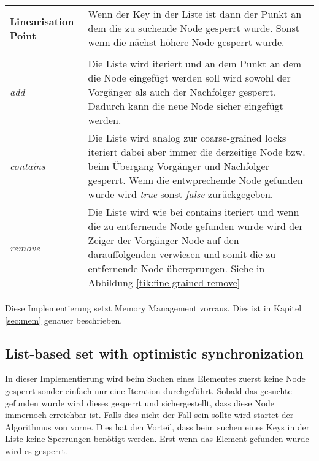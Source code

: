 \begin{table}[H]
    \begin{tabularx}{\textwidth}{lX}
        \textbf{Linearisation Point} & Wenn der Key in der Liste ist dann der Punkt an dem die zu suchende Node gesperrt wurde. Sonst wenn die nächst höhere Node gesperrt wurde.\\
        \\
        \textit{add} & Die Liste wird iteriert und an dem Punkt an dem die Node eingefügt werden soll wird sowohl der Vorgänger als auch der Nachfolger gesperrt. Dadurch kann die neue Node sicher eingefügt werden.\\
        \textit{contains} & Die Liste wird analog zur coarse-grained locks iteriert dabei aber immer die derzeitige Node bzw. beim Übergang Vorgänger und Nachfolger gesperrt. Wenn die entwprechende Node gefunden wurde wird \textit{true} sonst \textit{false} zurückgegeben. \\
        \textit{remove} & Die Liste wird wie bei contains iteriert und wenn die zu entfernende Node gefunden wurde wird der Zeiger der Vorgänger Node auf den darauffolgenden verwiesen und somit die zu entfernende Node übersprungen. Siehe in Abbildung \ref{tik:fine-grained-remove}\\
    \end{tabularx}
\end{table}

Diese Implementierung setzt Memory Management vorraus. Dies ist in Kapitel \ref{sec:mem} genauer beschrieben.

\subsection{List-based set with optimistic synchronization}

In dieser Implementierung wird beim Suchen eines Elementes zuerst keine Node gesperrt sonder einfach nur eine Iteration durchgeführt. Sobald das gesuchte gefunden wurde wird dieses gesperrt und sichergestellt, dass diese Node immernoch erreichbar ist. Falls dies nicht der Fall sein sollte wird startet der Algorithmus von vorne. Dies hat den Vorteil, dass beim suchen eines Keys in der Liste keine Sperrungen benötigt werden. Erst wenn das Element gefunden wurde wird es gesperrt.

